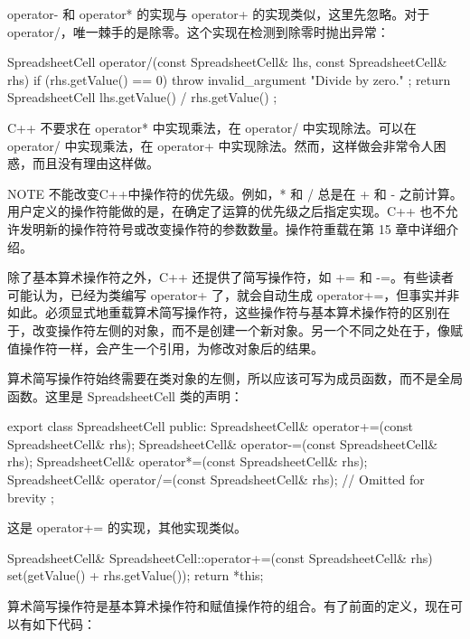 operator- 和 operator* 的实现与 operator+ 的实现类似，这里先忽略。对于 operator/，唯一棘手的是除零。这个实现在检测到除零时抛出异常：

\begin{cpp}
SpreadsheetCell operator/(const SpreadsheetCell& lhs,
    const SpreadsheetCell& rhs)
{
    if (rhs.getValue() == 0) {
        throw invalid_argument { "Divide by zero." };
    }
    return SpreadsheetCell { lhs.getValue() / rhs.getValue() };
}
\end{cpp}

C++ 不要求在 operator* 中实现乘法，在 operator/ 中实现除法。可以在 operator/ 中实现乘法，在 operator+ 中实现除法。然而，这样做会非常令人困惑，而且没有理由这样做。

\begin{myNotic}{NOTE}
不能改变C++中操作符的优先级。例如，* 和 / 总是在 + 和 - 之前计算。用户定义的操作符能做的是，在确定了运算的优先级之后指定实现。C++ 也不允许发明新的操作符符号或改变操作符的参数数量。操作符重载在第 15 章中详细介绍。
\end{myNotic}


除了基本算术操作符之外，C++ 还提供了简写操作符，如 += 和 -=。有些读者可能认为，已经为类编写 operator+ 了，就会自动生成 operator+=，但事实并非如此。必须显式地重载算术简写操作符，这些操作符与基本算术操作符的区别在于，改变操作符左侧的对象，而不是创建一个新对象。另一个不同之处在于，像赋值操作符一样，会产生一个引用，为修改对象后的结果。

算术简写操作符始终需要在类对象的左侧，所以应该可写为成员函数，而不是全局函数。这里是 SpreadsheetCell 类的声明：

\begin{cpp}
export class SpreadsheetCell
{
    public:
        SpreadsheetCell& operator+=(const SpreadsheetCell& rhs);
        SpreadsheetCell& operator-=(const SpreadsheetCell& rhs);
        SpreadsheetCell& operator*=(const SpreadsheetCell& rhs);
        SpreadsheetCell& operator/=(const SpreadsheetCell& rhs);
        // Omitted for brevity
};
\end{cpp}

这是 operator+= 的实现，其他实现类似。

\begin{cpp}
SpreadsheetCell& SpreadsheetCell::operator+=(const SpreadsheetCell& rhs)
{
    set(getValue() + rhs.getValue());
    return *this;
}
\end{cpp}

算术简写操作符是基本算术操作符和赋值操作符的组合。有了前面的定义，现在可以有如下代码：

